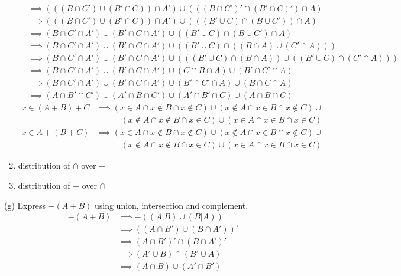 \documentclass{article}
\begin{document}
\begin{enumerate}
\begin{align*}
        &\implies (((B \cap C') \cup (B' \cap C)) \cap A') \cup (((B \cap C')' \cap (B' \cap C)') \cap A)\\
        &\implies (((B \cap C') \cup (B' \cap C)) \cap A') \cup (((B' \cup C) \cap (B \cup C')) \cap A)\\
        &\implies (B \cap C' \cap A') \cup (B' \cap C \cap A') \cup ((B' \cup C) \cap (B \cup C') \cap A)\\
        &\implies (B \cap C' \cap A') \cup (B' \cap C \cap A') \cup ((B' \cup C) \cap ((B \cap A ) \cup (C' \cap A)))\\
        &\implies (B \cap C' \cap A') \cup (B' \cap C \cap A') \cup (((B' \cup C) \cap (B \cap A )) \cup ((B' \cup C) \cap (C' \cap A)))\\
        &\implies (B \cap C' \cap A') \cup (B' \cap C \cap A') \cup (C \cap B \cap A) \cup (B' \cap C' \cap A)\\
        &\implies (B \cap C' \cap A') \cup (B' \cap C \cap A') \cup (B' \cap C' \cap A) \cup (B \cap C \cap A)\\
        &\implies (A \cap B' \cap C') \cup (A' \cap B \cap C') \cup (A' \cap B' \cap C) \cup (A \cap B \cap C)
    \end{align*}
    \begin{align*}
        x \in (A + B) + C &\implies(x \in A \cap x \notin B \cap x \notin C) \cup (x \notin A \cap x \in B \cap x \notin C) \cup\\
        &\qquad\quad(x \notin A \cap x \notin B \cap x \in C) \cup (x \in A \cap x \in B \cap x \in C)
    \end{align*}
    \begin{align*}
        x \in A + (B + C) &\implies (x \in A \cap x \notin B \cap x \notin C) \cup (x \notin A \cap x \in B \cap x \notin C) \cup\\
        &\qquad\quad(x \notin A \cap x \notin B \cap x \in C) \cup (x \in A \cap x \in B \cap x \in C)
    \end{align*}
    \item distribution of $\cap$ over +
    \item distribution of + over $\cap$
\end{enumerate}
(g) Express $-(A+B)$ using union, intersection and complement.\\
\begin{align*}
    -(A+B) &\implies -((A|B) \cup (B|A))\\
           &\implies ((A \cap B') \cup (B \cap A'))'\\
           &\implies (A \cap B')' \cap (B \cap A')'\\
           &\implies (A' \cup B) \cap (B' \cup A)\\
           &\implies (A \cap B) \cup (A' \cap B')\\
\end{align*}
\end{document}
